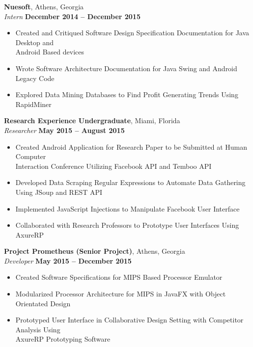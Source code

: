 \documentclass[margin,line]{resume}
\begin{document}
\begin{resume}
	\textbf{Nuesoft}, Athens, Georgia \vspace{1mm}\\\vspace{1mm}%
	\textsl{Intern} \hfill \textbf{December 2014 -- December 2015}
	\begin{itemize}
	  	\item Created and Critiqued Software Design Specification Documentation for Java Desktop and\\
	  	Android Based devices 
	  	\item Wrote Software Architecture Documentation for Java Swing and Android Legacy Code 
	  	\item Explored Data Mining Databases to Find Profit Generating Trends Using RapidMiner
	\end{itemize}

	\textbf{Research Experience Undergraduate}, Miami, Florida \vspace{1mm}\\\vspace{1mm}%
	\textsl{Researcher} \hfill \textbf{May 2015 -- August 2015}
	\begin{itemize}
		\item Created Android Application for Research Paper to be Submitted at Human Computer\\
		Interaction Conference Utilizing Facebook API and Temboo API
		\item Developed Data Scraping Regular Expressions to Automate Data Gathering Using JSoup and REST API
		\item Implemented JavaScript Injections to Manipulate Facebook User Interface
		\item Collaborated with Research Professors to Prototype User Interfaces Using AxureRP
	\end{itemize}
	
	\textbf{Project Prometheus (Senior Project)}, Athens, Georgia \vspace{1mm}\\\vspace{1mm}%
	\textsl{Developer} \hfill \textbf{May 2015 -- December 2015}
	\begin{itemize}
		\item Created Software Specifications for MIPS Based Processor Emulator 
		\item Modularized Processor Architecture for MIPS in JavaFX with Object Orientated Design
		\item Prototyped User Interface in Collaborative Design Setting with Competitor Analysis Using \\
		AxureRP Prototyping Software  
	\end{itemize}
	

\end{resume}
\end{document}
